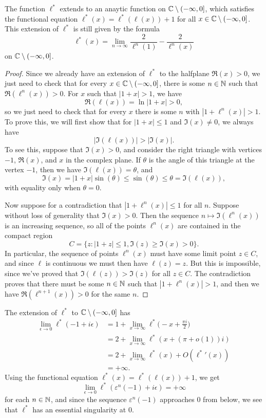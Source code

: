 \documentclass[letterpaper,11pt]{article}
\begin{document}
\begin{prop} The function $\ell^*$ extends to an anaytic function on $\mathbb{C} \setminus (-\infty,0]$, which satisfies the functional equation $\ell^*(x) = \ell^*(\ell(x)) + 1$ for all $x \in \mathbb{C} \setminus (-\infty,0]$. This extension of $\ell^*$ is still given by the formula
\[
\ell^*(x) = \lim_{n\rightarrow \infty} \frac{2}{\ell^n(1)} - \frac{2}{\ell^n(x)}
\]
on $\mathbb{C} \setminus (-\infty,0]$.
\end{prop}
\begin{proof} Since we already have an extension of $\ell^*$ to the halfplane $\Re(x) > 0$, we just need to check that for every $x \in \mathbb{C}\setminus(-\infty,0]$, there is some $n \in \mathbb{N}$ such that $\Re(\ell^n(x)) > 0$. For $x$ such that $|1+x| > 1$, we have
\[
\Re(\ell(x)) = \ln|1+x| > 0,
\]
so we just need to check that for every $x$ there is some $n$ with $|1+\ell^n(x)| > 1$. To prove this, we will first show that for $|1 + x| \le 1$ and $\Im(x) \ne 0$, we always have
\[
|\Im(\ell(x))| > |\Im(x)|.
\]
To see this, suppose that $\Im(x) > 0$, and consider the right triangle with vertices $-1$, $\Re(x)$, and $x$ in the complex plane. If $\theta$ is the angle of this triangle at the vertex $-1$, then we have $\Im(\ell(x)) = \theta$, and
\[
\Im(x) = |1+x|\sin(\theta) \le \sin(\theta) \le \theta = \Im(\ell(x)),
\]
with equality only when $\theta = 0$.

Now suppose for a contradiction that $|1 + \ell^n(x)| \le 1$ for all $n$. Suppose without loss of generality that $\Im(x) > 0$. Then the sequence $n \mapsto \Im(\ell^n(x))$ is an increasing sequence, so all of the points $\ell^n(x)$ are contained in the compact region
\[
C = \{z : |1+z| \le 1, \Im(z) \ge \Im(x) > 0\}.
\]
In particular, the sequence of points $\ell^n(x)$ must have some limit point $z \in C$, and since $\ell$ is continuous we must then have $\ell(z) = z$. But this is impossible, since we've proved that $\Im(\ell(z)) > \Im(z)$ for all $z \in C$. The contradiction proves that there must be some $n \in \mathbb{N}$ such that $|1+\ell^n(x)| > 1$, and then we have $\Re(\ell^{n+1}(x)) > 0$ for the same $n$.
\end{proof}

The extension of $\ell^*$ to $\mathbb{C} \setminus (-\infty,0]$ has
\begin{align*}
\lim_{\epsilon \rightarrow 0} \ell^*(-1 + i\epsilon) &= 1 + \lim_{x \rightarrow \infty} \ell^*\Big(-x + \frac{\pi i}{2}\Big)\\
&= 2 + \lim_{x \rightarrow \infty} \ell^*(x + (\pi + o(1)) i)\\
&= 2 + \lim_{x \rightarrow \infty} \ell^*(x) + O({\ell^*}'(x))\\
&= +\infty.
\end{align*}
Using the functional equation $\ell^*(x) = \ell^*(\ell(x)) + 1$, we get
\[
\lim_{\epsilon \rightarrow 0} \ell^*(\varepsilon^n(-1) + i\epsilon) = +\infty
\]
for each $n \in \mathbb{N}$, and since the sequence $\varepsilon^n(-1)$ approaches $0$ from below, we see that $\ell^*$ has an essential singularity at $0$.
\end{document}
